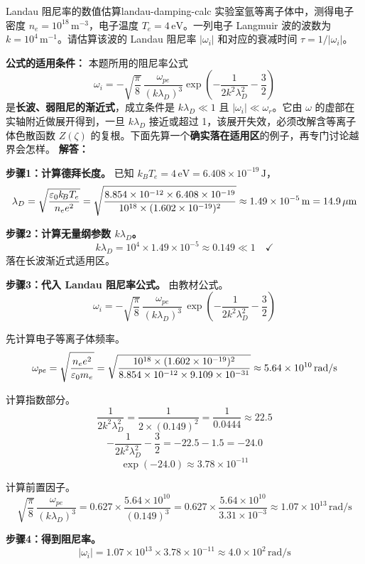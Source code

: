 \begin{example}{Landau 阻尼率的数值估算}{landau-damping-calc}
实验室氩等离子体中，测得电子密度 $n_e = 10^{18}\,\mathrm{m}^{-3}$，电子温度 $T_e = 4\,\mathrm{eV}$。一列电子 Langmuir 波的波数为 $k = 10^{4}\,\mathrm{m}^{-1}$。请估算该波的 Landau 阻尼率 $|\omega_i|$ 和对应的衰减时间 $\tau = 1/|\omega_i|$。

\textbf{公式的适用条件：} 本题所用的阻尼率公式
\[
\omega_i = -\sqrt{\frac{\pi}{8}}\,\frac{\omega_{pe}}{(k\lambda_D)^3}\exp\!\left(-\frac{1}{2k^2\lambda_D^2} - \frac{3}{2}\right)
\]
是\textbf{长波、弱阻尼的渐近式}，成立条件是 $k\lambda_D\ll1$ 且 $|\omega_i|\ll\omega_r$。它由 $\omega$ 的虚部在实轴附近做展开得到，一旦 $k\lambda_D$ 接近或超过 1，该展开失效，必须改解含等离子体色散函数 $Z(\zeta)$ 的复根。下面先算一个\textbf{确实落在适用区}的例子，再专门讨论越界会怎样。
\tcblower
\textbf{解答：}

\textbf{步骤1：计算德拜长度。}
已知 $k_{\!B}T_e = 4\,\mathrm{eV} = 6.408\times 10^{-19}\,\mathrm{J}$，
\[
\lambda_D = \sqrt{\frac{\varepsilon_0 k_{\!B}T_e}{n_e e^2}}
= \sqrt{\frac{8.854\times 10^{-12}\times 6.408\times 10^{-19}}{10^{18}\times (1.602\times 10^{-19})^2}}
\approx 1.49\times 10^{-5}\,\mathrm{m} = 14.9\,\mu\mathrm{m}
\]

\textbf{步骤2：计算无量纲参数 $k\lambda_D$。}
\[
k\lambda_D = 10^{4}\times 1.49\times 10^{-5} \approx 0.149 \ll 1 \quad\checkmark
\]
落在长波渐近式适用区。

\textbf{步骤3：代入 Landau 阻尼率公式。}
由教材公式。
\[
\omega_i = -\sqrt{\frac{\pi}{8}}\,\frac{\omega_{pe}}{(k\lambda_D)^3}\,
\exp\!\left(-\frac{1}{2k^2\lambda_D^2} - \frac{3}{2}\right)
\]

先计算电子等离子体频率。
\[
\omega_{pe} = \sqrt{\frac{n_e e^2}{\varepsilon_0 m_e}}
= \sqrt{\frac{10^{18}\times (1.602\times 10^{-19})^2}{8.854\times 10^{-12}\times 9.109\times 10^{-31}}}
\approx 5.64\times 10^{10}\,\mathrm{rad/s}
\]

计算指数部分。
\[
\frac{1}{2k^2\lambda_D^2} = \frac{1}{2\times (0.149)^2} = \frac{1}{0.0444} \approx 22.5
\]
\[
-\frac{1}{2k^2\lambda_D^2} - \frac{3}{2} = -22.5 - 1.5 = -24.0
\]
\[
\exp(-24.0) \approx 3.78\times 10^{-11}
\]

计算前置因子。
\[
\sqrt{\frac{\pi}{8}}\,\frac{\omega_{pe}}{(k\lambda_D)^3}
= 0.627\times \frac{5.64\times 10^{10}}{(0.149)^3}
= 0.627\times \frac{5.64\times 10^{10}}{3.31\times 10^{-3}}
\approx 1.07\times 10^{13}\,\mathrm{rad/s}
\]

\textbf{步骤4：得到阻尼率。}
\[
|\omega_i| = 1.07\times 10^{13}\times 3.78\times 10^{-11} \approx 4.0\times 10^{2}\,\mathrm{rad/s}
\]


\end{example}
